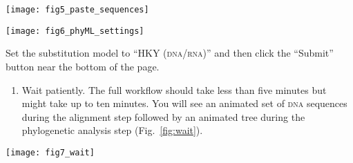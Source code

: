 \documentclass[11pt, addpoints]{exam}
\begin{document}
\newpage

\begin{center}
	\texttt{[image: fig5\_paste\_sequences]}
\end{center}

\vfill

\begin{center}
	\texttt{[image: fig6\_phyML\_settings]}
\end{center}

\noindent Set the substitution model to “HKY{} (\textsc{dna/rna})” and then click the “Submit” button near the bottom of the page.


\begin{enumerate}
\item
  Wait patiently. The full workflow should take less than five minutes but might take up to ten minutes.
  You will see an animated set of \textsc{dna} sequences during the alignment
  step followed by an animated tree during the phylogenetic analysis
  step (Fig.~\ref{fig:wait}).
\end{enumerate}

\begin{center}
	\texttt{[image: fig7\_wait]}
\end{center}
\end{document}
